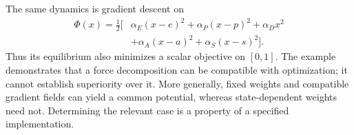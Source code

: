 The same dynamics is gradient descent on
\begin{align}
 \Phi(x)=\tfrac12[&\alpha_E(x-e)^2+\alpha_P(x-p)^2+\alpha_Dx^2\nonumber\\
                 &+\alpha_A(x-a)^2+\alpha_S(x-s)^2].
 \label{eq:toy_potential}
\end{align}
Thus its equilibrium also minimizes a scalar objective on $[0,1]$. The example demonstrates that a force decomposition can be compatible with optimization; it cannot establish superiority over it. More generally, fixed weights and compatible gradient fields can yield a common potential, whereas state-dependent weights need not. Determining the relevant case is a property of a specified implementation.
